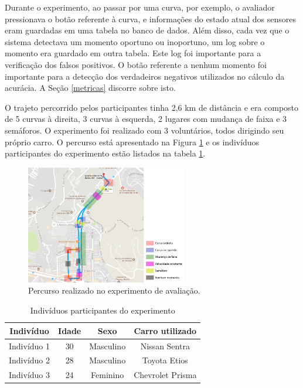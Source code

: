 Durante o experimento, ao passar por uma curva, por exemplo, o avaliador pressionava o botão
referente à curva, e informações do estado atual dos sensores eram guardadas em uma tabela no banco de dados.
Além disso, cada vez que o sistema detectava um momento oportuno ou inoportuno, um log sobre o
momento era guardado em outra tabela. Este log foi importante para a verificação dos falsos positivos.
O botão referente a nenhum momento foi importante para a detecção dos verdadeiros negativos utilizados
no cálculo da acurácia. A Seção \ref{metricas} discorre sobre isto.

O trajeto percorrido pelos participantes tinha 2,6 km de distância e era composto de 5 curvas à direita,
3 curvas à esquerda, 2 lugares com mudança de faixa e 3 semáforos. O experimento foi realizado com 3
voluntários, todos dirigindo seu próprio carro. O percurso está apresentado na Figura \ref{percurso} e os
indivíduos participantes do experimento estão listados na tabela \ref{participantes}.

\begin{figure}[H]
\centering
\includegraphics[width=0.63\textwidth]{images/percurso.png}
\caption{Percurso realizado no experimento de avaliação.}
\label{percurso}
\end{figure}

\begin{table}[h]
\centering
\caption{Indivíduos participantes do experimento}
\label{participantes}
\begin{tabular}{|c|c|c|c|}
\hline
\textbf{Indivíduo} & \textbf{Idade} & \textbf{Sexo} & \textbf{Carro utilizado} \\ \hline
Indivíduo 1        & 30             & Masculino     & Nissan Sentra            \\ \hline
Indivíduo 2        & 28             & Masculino     & Toyota Etios             \\ \hline
Indivíduo 3        & 24             & Feminino      & Chevrolet Prisma         \\ \hline
\end{tabular}
\end{table}

